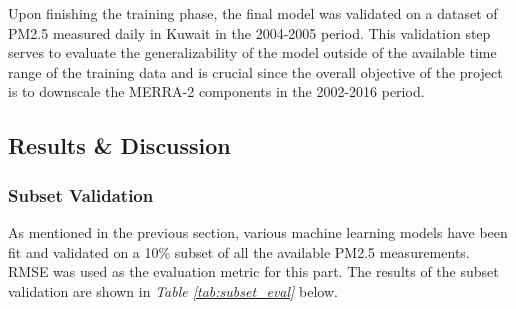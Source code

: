 \documentclass[draft]{agujournal2019}
\begin{document}
Upon finishing the training phase, the final model was validated on a dataset of PM2.5 measured daily in Kuwait in the 2004-2005 period. This validation step serves to evaluate the generalizability of the model outside of the available time range of the training data and is crucial since the overall objective of the project is to downscale the MERRA-2 components in the 2002-2016 period.

\subsection{Results \& Discussion}

\subsubsection{Subset Validation}

As mentioned in the previous section, various machine learning models have been fit and validated on a 10\% subset of all the available PM2.5 measurements. RMSE was used as the evaluation metric for this part. The results of the subset validation are shown in \textit{Table \ref{tab:subset_eval}} below.
\end{document}
